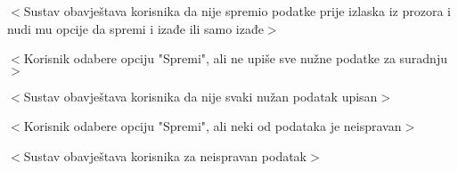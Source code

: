 \begin{packed_item}
\begin{packed_item}
\begin{packed_enum}
								\item $<$Sustav obavještava korisnika da nije spremio podatke prije izlaska
								iz prozora i nudi mu opcije da spremi i izađe ili samo izađe$>$

							\end{packed_enum}

							\item[8.b] $<$Korisnik odabere opciju "Spremi", ali ne upiše sve nužne podatke za suradnju$>$
							\item[] \begin{packed_enum}

								\item $<$Sustav obavještava korisnika da nije svaki nužan podatak upisan$>$

							\end{packed_enum}

							\item[8.c] $<$Korisnik odabere opciju "Spremi", ali neki od podataka je neispravan$>$
							\item[] \begin{packed_enum}

								\item $<$Sustav obavještava korisnika za neispravan podatak$>$

							\end{packed_enum}

						\end{packed_item}
					\end{packed_item}

